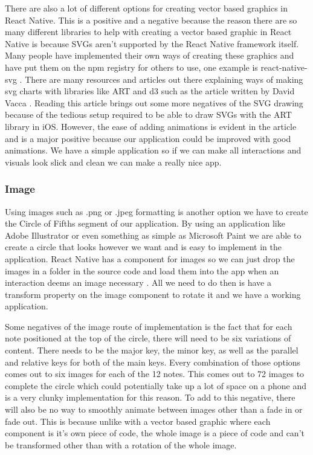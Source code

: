 \documentclass[onecolumn, draftclsnofoot,10pt, compsoc]{IEEEtran}
\begin{document}
There are also a lot of different options for creating vector based graphics in React Native.
This is a positive and a negative because the reason there are so many different libraries to help with creating a vector based graphic in React Native is because SVGs aren't supported by the React Native framework itself.
Many people have implemented their own ways of creating these graphics and have put them on the npm registry for others to use, one example is react-native-svg \cite{rnsvg}.
There are many resources and articles out there explaining ways of making svg charts with libraries like ART and d3 such as the article written by David Vacca \cite{rncharts}.
Reading this article brings out some more negatives of the SVG drawing because of the tedious setup required to be able to draw SVGs with the ART library in iOS.
However, the ease of adding animations is evident in the article and is a major positive because our application could be improved with good animations.
We have a simple application so if we can make all interactions and visuals look slick and clean we can make a really nice app.

\subsubsection{Image}

Using images such as .png or .jpeg formatting is another option we have to create the Circle of Fifths segment of our application.
By using an application like Adobe Illustrator or even something as simple as Microsoft Paint we are able to create a circle that looks however we want and is easy to implement in the application.
React Native has a component for images so we can just drop the images in a folder in the source code and load them into the app when an interaction deems an image necessary \cite{rnimage}.
All we need to do then is have a transform property on the image component to rotate it and we have a working application.

Some negatives of the image route of implementation is the fact that for each note positioned at the top of the circle, there will need to be six variations of content.
There needs to be the major key, the minor key, as well as the parallel and relative keys for both of the main keys.
Every combination of those options comes out to six images for each of the 12 notes.
This comes out to 72 images to complete the circle which could potentially take up a lot of space on a phone and is a very clunky implementation for this reason.
To add to this negative, there will also be no way to smoothly animate between images other than a fade in or fade out.
This is because unlike with a vector based graphic where each component is it's own piece of code, the whole image is a piece of code and can't be transformed other than with a rotation of the whole image.
\end{document}
